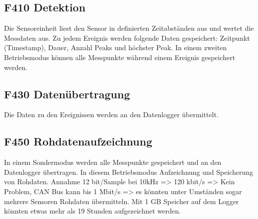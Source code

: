 \subsection{F410 Detektion}
Die Sensoreinheit liest den Sensor in definierten Zeitabständen aus und wertet die Messdaten aus. Zu jedem Ereignis werden folgende Daten gespeichert: Zeitpunkt (Timestamp), Dauer, Anzahl Peaks und höchster Peak. In einem zweiten Betriebsmodus können alle Messpunkte während einem Ereignis gespeichert werden.

\subsection{F430 Datenübertragung}
Die Daten zu den Ereignissen werden an den Datenlogger übermittelt.

\subsection{F450 Rohdatenaufzeichnung}
In einem Sondermodus werden alle Messpunkte gespeichert und an den Datenlogger übertragen. In diesem Betriebsmodus  Aufzeichnung und Speicherung von Rohdaten. Annahme 12 bit/Sample bei 10kHz => 120 kbit/s => Kein Problem, CAN Bus kann bis 1 Mbit/s => es könnten unter Umständen sogar mehrere Sensoren Rohdaten übermitteln. Mit 1 GB Speicher auf dem Logger könnten etwas mehr als 19 Stunden aufgezeichnet werden.


